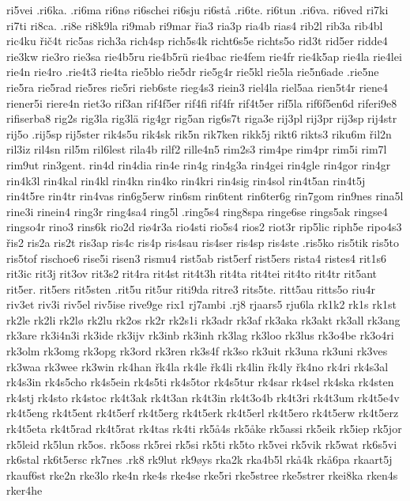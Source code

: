 {{ri5vei
.ri6ka.
.ri6ma
ri6nø
ri6schei
ri6sju
ri6stå
.ri6te.
ri6tun
.ri6va.
ri6ved
ri7ki
ri7ti
ri8ca.
.ri8e
ri8k9la
ri9mab
ri9mar
řia3
ria3p
ria4b
rias4
rib2l
rib3a
rib4bl
ric4ku
řič4t
ric5as
rich3a
rich4sp
rich5s4k
richt6s5e
richts5o
rid3t
rid5er
ridde4
rie3kw
rie3ro
rie3sa
rie4b5ru
rie4b5rü
rie4bac
rie4fem
rie4fr
rie4k5ap
rie4la
rie4lei
rie4n
rie4ro
.rie4t3
rie4ta
rie5blo
rie5dr
rie5g4r
rie5kl
rie5la
rie5n6ade
.rie5ne
rie5ra
rie5rad
rie5res
rie5ri
rieb6ste
rieg4s3
riein3
riel4la
riel5aa
rien5t4r
riene4
riener5i
riere4n
riet3o
rif3an
rif4f5er
rif4fi
rif4fr
rif4t5er
rif5la
rif6f5en6d
riferi9e8
rifiserba8
rig2s
rig3la
rig3lä
rig4gr
rig5an
rig6s7t
riga3e
rij3pl
rij3pr
rij3sp
rij4str
rij5o
.rij5sp
rij5ster
rik4s5u
rik4sk
rik5n
rik7ken
rikk5j
rikt6
rikts3
riku6m
řil2n
ril3iz
ril4sn
ril5m
ril6lest
rila4b
rilf2
rille4n5
rim2s3
rim4pe
rim4pr
rim5i
rim7l
rim9ut
rin3gent.
rin4d
rin4dia
rin4e
rin4g
rin4g3a
rin4gei
rin4gle
rin4gor
rin4gr
rin4k3l
rin4kal
rin4kl
rin4kn
rin4ko
rin4kri
rin4sig
rin4sol
rin4t5an
rin4t5j
rin4t5re
rin4tr
rin4vas
rin6g5erw
rin6sm
rin6tent
rin6ter6g
rin7gom
rin9nes
rina5l
rine3i
rinein4
ring3r
ring4sa4
ring5l
.ring5s4
ring8spa
ringe6se
rings5ak
ringse4
ringso4r
rino3
rins6k
rio2d
riø4r3a
rio4sti
rio5s4
rios2
riot3r
rip5lic
riph5e
ripo4s3
řis2
ris2a
ris2t
ris3ap
ris4c
ris4p
ris4sau
ris4ser
ris4sp
ris4ste
.ris5ko
ris5tik
ris5to
ris5tof
rischoe6
rise5i
risen3
rismu4
rist5ab
rist5erf
rist5ers
rista4
ristes4
rit1s6
rit3ic
rit3j
rit3ov
rit3s2
rit4ra
rit4st
rit4t3h
rit4ta
rit4tei
rit4to
rit4tr
rit5ant
rit5er.
rit5ers
rit5sten
.rit5u
rit5ur
riti9da
ritre3
rits5te.
ritt5au
ritts5o
riu4r
riv3et
riv3i
riv5el
riv5ise
rive9ge
rix1
rj7ambi
.rj8
rjaars5
rju6la
rk1k2
rk1s
rk1st
rk2le
rk2li
rk2lø
rk2lu
rk2os
rk2r
rk2s1i
rk3adr
rk3af
rk3aka
rk3akt
rk3all
rk3ang
rk3are
rk3i4n3i
rk3ide
rk3ijv
rk3inb
rk3inh
rk3lag
rk3loo
rk3lus
rk3o4be
rk3o4ri
rk3olm
rk3omg
rk3opg
rk3ord
rk3ren
rk3s4f
rk3so
rk3uit
rk3una
rk3uni
rk3ves
rk3waa
rk3wee
rk3win
rk4han
řk4la
rk4le
řk4li
rk4lin
řk4ly
řk4no
rk4ri
rk4s3al
rk4s3in
rk4s5cho
rk4s5ein
rk4s5ti
rk4s5tor
rk4s5tur
rk4sar
rk4sel
rk4ska
rk4sten
rk4stj
rk4sto
rk4stoc
rk4t3ak
rk4t3an
rk4t3in
rk4t3o4b
rk4t3ri
rk4t3um
rk4t5e4v
rk4t5eng
rk4t5ent
rk4t5erf
rk4t5erg
rk4t5erk
rk4t5erl
rk4t5ero
rk4t5erw
rk4t5erz
rk4t5eta
rk4t5rad
rk4t5rat
rk4tas
rk4ti
rk5å4s
rk5åke
rk5assi
rk5eik
rk5iep
rk5jor
rk5leid
rk5lun
rk5os.
rk5oss
rk5rei
rk5si
rk5ti
rk5to
rk5vei
rk5vik
rk5wat
rk6s5vi
rk6stal
rk6t5ersc
rk7nes
.rk8
rk9lut
rk9øys
rka2k
rka4b5l
rkå4k
rkå6pa
rkaart5j
rkauf6st
rke2n
rke3lo
rke4n
rke4s
rke4se
rke5ri
rke5stree
rke5strer
rkei8ka
rken4s
rker4he
}}
